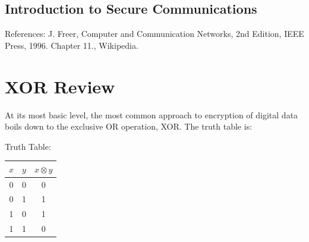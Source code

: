 %
%
%
%
%
%
%
%
%
%
%

\begin{center}
    \section*{Introduction to Secure Communications}
\end{center}

References: J. Freer, Computer and Communication Networks, 2nd Edition,
IEEE Press, 1996.  Chapter 11.,  
Wikipedia.

\section{XOR Review}

At its most basic level, the most common approach to
encryption of digital data boils down to the exclusive OR operation,
XOR.    The truth table is:

\begin{center}
Truth Table:
\begin{tabular}{cc|c}
$x$  & $y$  &  $x \otimes y$ \\ \hline
0  & 0   &  0 \\
0  & 1   &  1 \\
1  & 0   &  1 \\
1  & 1   &  0 \\
\end{tabular}
\end{center}
 
